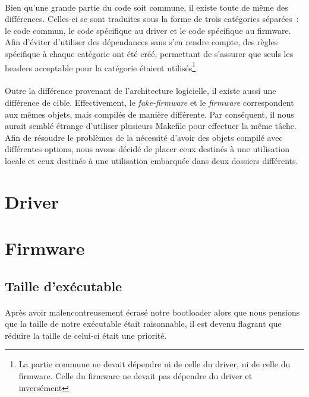\paragraph{}
Bien qu'une grande partie du code soit commune, il existe toute de même des
différences. Celles-ci se sont traduites sous la forme de trois catégories
séparées~:
le code commun, le code spécifique au driver et le code spécifique au firmware.
Afin d'éviter d'utiliser des dépendances sans s'en rendre compte, des règles
spécifique à chaque catégorie ont été créé, permettant de s'assurer que seuls
les headers acceptable pour la catégorie étaient utilisés\footnote{La partie
commune ne devait dépendre ni de celle du driver, ni de celle du firmware. Celle
du firmware ne devait pas dépendre du driver et inversément}.

\paragraph{}
Outre la différence provenant de l'architecture logicielle, il existe aussi une
différence de cible. Effectivement, le {\em fake-firmware} et le {\em firmware}
correspondent aux mêmes objets, mais compilés de manière différente. Par
conséquent, il nous aurait semblé étrange d'utiliser plusieurs Makefile pour
effectuer la même tâche. Afin de résoudre le problèmes de la nécessité d'avoir
des objets compilé avec différentes options, nous avons décidé de placer ceux
destinés à une utilisation locale et ceux destinés à une utilisation embarquée
dans deux dossiers différents.

\section{Driver}

\section{Firmware}

\subsection{Taille d'exécutable}
\paragraph{}
Après avoir malencontreusement écrasé notre bootloader alors que nous pensions
que la taille de notre exécutable était raisonnable, il est devenu flagrant que
réduire la taille de celui-ci était une priorité.

